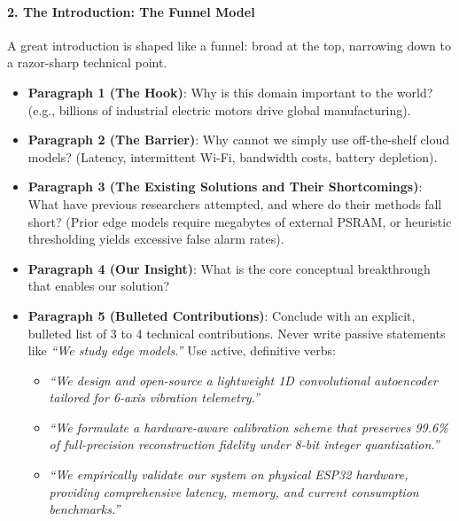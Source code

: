 \paragraph{2. The Introduction: The Funnel Model}
A great introduction is shaped like a funnel: broad at the top, narrowing down to a razor-sharp technical point.
\begin{itemize}
    \item \textbf{Paragraph 1 (The Hook)}: Why is this domain important to the world? (e.g., billions of industrial electric motors drive global manufacturing).
    \item \textbf{Paragraph 2 (The Barrier)}: Why cannot we simply use off-the-shelf cloud models? (Latency, intermittent Wi-Fi, bandwidth costs, battery depletion).
    \item \textbf{Paragraph 3 (The Existing Solutions and Their Shortcomings)}: What have previous researchers attempted, and where do their methods fall short? (Prior edge models require megabytes of external PSRAM, or heuristic thresholding yields excessive false alarm rates).
    \item \textbf{Paragraph 4 (Our Insight)}: What is the core conceptual breakthrough that enables our solution?
    \item \textbf{Paragraph 5 (Bulleted Contributions)}: Conclude with an explicit, bulleted list of 3 to 4 technical contributions. Never write passive statements like \emph{``We study edge models.''} Use active, definitive verbs:
    \begin{itemize}
        \item \emph{``We design and open-source a lightweight 1D convolutional autoencoder tailored for 6-axis vibration telemetry.''}
        \item \emph{``We formulate a hardware-aware calibration scheme that preserves 99.6\% of full-precision reconstruction fidelity under 8-bit integer quantization.''}
        \item \emph{``We empirically validate our system on physical ESP32 hardware, providing comprehensive latency, memory, and current consumption benchmarks.''}
    \end{itemize}
\end{itemize}

